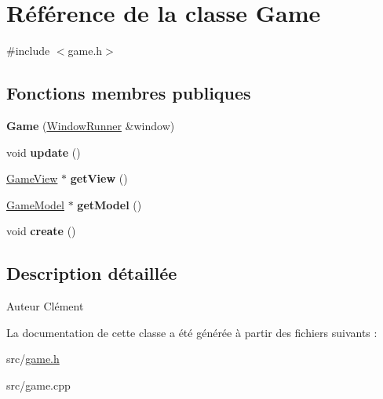 \hypertarget{class_game}{\section{Référence de la classe Game}
\label{class_game}
}


{\ttfamily \#include $<$game.\+h$>$}

\subsection*{Fonctions membres publiques}
\begin{DoxyCompactItemize}
\item 
\hypertarget{class_game_a7f667d1e0a4c90086551b3f1a33cf058}{{\bfseries Game} (\hyperlink{class_window_runner}{Window\+Runner} \&window)}\label{class_game_a7f667d1e0a4c90086551b3f1a33cf058}

\item 
\hypertarget{class_game_a79df6376b332d63c9eca0dcee30305c3}{void {\bfseries update} ()}\label{class_game_a79df6376b332d63c9eca0dcee30305c3}

\item 
\hypertarget{class_game_a9a78db833ce19e6ae43295d29e27f31c}{\hyperlink{class_game_view}{Game\+View} $\ast$ {\bfseries get\+View} ()}\label{class_game_a9a78db833ce19e6ae43295d29e27f31c}

\item 
\hypertarget{class_game_aeea0c2d8c011bdc307a3142d60faf7c5}{\hyperlink{class_game_model}{Game\+Model} $\ast$ {\bfseries get\+Model} ()}\label{class_game_aeea0c2d8c011bdc307a3142d60faf7c5}

\item 
\hypertarget{class_game_a089dac799134ffbcd2fd171193828e6c}{void {\bfseries create} ()}\label{class_game_a089dac799134ffbcd2fd171193828e6c}

\end{DoxyCompactItemize}


\subsection{Description détaillée}
\begin{DoxyAuthor}{Auteur}
Clément 
\end{DoxyAuthor}


La documentation de cette classe a été générée à partir des fichiers suivants \+:\begin{DoxyCompactItemize}
\item 
src/\hyperlink{game_8h}{game.\+h}\item 
src/game.\+cpp\end{DoxyCompactItemize}
